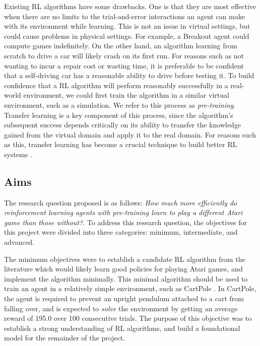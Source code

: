\documentclass[12pt,a4paper]{article}
\begin{document}
Existing RL algorithms have some drawbacks. One is that they are most effective when there are no limits to the trial-and-error interactions an agent can make with its environment while learning. This is not an issue in virtual settings, but could cause problems in physical settings. For example, a Breakout agent could compute games indefinitely. On the other hand, an algorithm learning from scratch to drive a car will likely crash on its first run. For reasons such as not wanting to incur a repair cost or wasting time, it is preferable to be confident that a self-driving car has a reasonable ability to drive before testing it. To build confidence that a RL algorithm will perform reasonably successfully in a real-world environment, we could first train the algorithm in a similar virtual environment, such as a simulation. We refer to this process as \textit{pre-training}. Transfer learning is a key component of this process, since the algorithm's subsequent success depends critically on its ability to transfer the knowledge gained from the virtual domain and apply it to the real domain. For reasons such as this, transfer learning has become a crucial technique to build better RL systems \cite{}. 

\subsection{Aims}
The research question proposed is as follows: \textit{How much more efficiently do reinforcement learning agents with pre-training learn to play a different Atari game than those without?}. To address this research question, the objectives for this project were divided into three categories: minimum, intermediate, and advanced. 

The minimum objectives were to establish a candidate RL algorithm from the literature which would likely learn good policies for playing Atari games, and implement the algorithm minimally. This minimal algorithm should be used to train an agent in a relatively simple environment, such as CartPole \cite{}. In CartPole, the agent is required to prevent an upright pendulum attached to a cart from falling over, and is expected to \textit{solve} the environment by getting an average reward of 195.0 over 100 consecutive trials. The purpose of this objective was to establish a strong understanding of RL algorithms, and build a foundational model for the remainder of the project.
\end{document}
